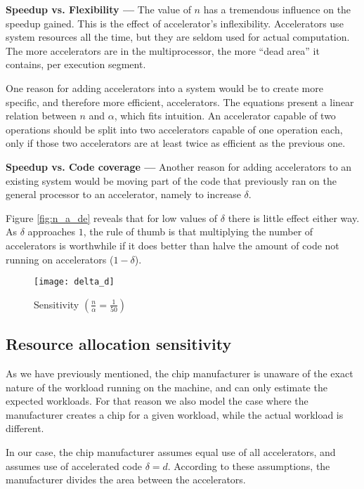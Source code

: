 \documentclass[twocolumn,english]{IEEEtran}
\begin{document}
\textbf{Speedup vs. Flexibility ---} The value of $n$ has a tremendous
influence on the speedup gained. This is the effect of accelerator's
inflexibility. Accelerators use system resources all the time, but
they are seldom used for actual computation. The more accelerators
are in the multiprocessor, the more {}``dead area'' it contains,
per execution segment.

One reason for adding accelerators into a system would be to create
more specific, and therefore more efficient, accelerators. The equations
present a linear relation between $n$ and $\alpha$, which fits intuition.
An accelerator capable of two operations should be split into two
accelerators capable of one operation each, only if those two accelerators
are at least twice as efficient as the previous one.

\textbf{Speedup vs. Code coverage --- }Another reason for adding accelerators
to an existing system would be moving part of the code that previously
ran on the general processor to an accelerator, namely to increase
$\delta$.

Figure \ref{fig:n_a_de} reveals that for low values of $\delta$
there is little effect either way. As $\delta$ approaches $1$, the
rule of thumb is that multiplying the number of accelerators is worthwhile
if it does better than halve the amount of code not running on accelerators
($1-\delta$).

\begin{figure}[t]
\texttt{[image: delta\_d]}

\caption{\label{fig:sensitivity}Sensitivity $(\frac{n}{\alpha}=\frac{1}{50})$}
\end{figure}



\subsection{Resource allocation sensitivity}

As we have previously mentioned, the chip manufacturer is unaware
of the exact nature of the workload running on the machine, and can
only estimate the expected workloads. For that reason we also model
the case where the manufacturer creates a chip for a given workload,
while the actual workload is different.

In our case, the chip manufacturer assumes equal use of all accelerators,
and assumes use of accelerated code $\delta=d$. According to these
assumptions, the manufacturer divides the area between the accelerators.
\end{document}
